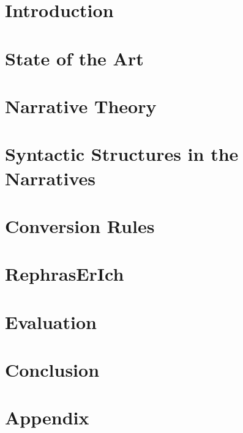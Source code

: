 \documentclass[digital, oneside, table, nolot, nolof]{fithesis4}
\begin{document}
\setlength{\overfullrule}{5pt} %

\chapter{Introduction} \label{chap:uvod}


\chapter{State of the Art} \label{chap:state-of-art}


\chapter{Narrative Theory} \label{chap:teorie-vypraveni}


\chapter{Syntactic Structures in the Narratives} \label{chap:syntax}


\chapter{Conversion Rules} \label{chap:navrh-pravidel}


\chapter{RephrasErIch} \label{chap:rerich}


\chapter{Evaluation} \label{chap:evaluace}


\chapter{Conclusion} \label{chap:zaver}


\printbibliography

\appendix
\chapter{Appendix} \label{chap:appendix}

\end{document}
